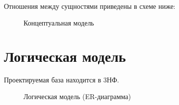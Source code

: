 \documentclass{article}
\begin{document}
Отношения между сущностями приведены в схеме ниже:

\begin{figure}[h]
    \caption{Концептуальная модель}
    \label{fig:image}
\end{figure}

\newpage

\section{Логическая модель}

Проектируемая база находится в 3НФ.

\begin{figure}[h]
    \caption{Логическая модель (ER-диаграмма)}
    \label{fig:image}
\end{figure}
\end{document}
